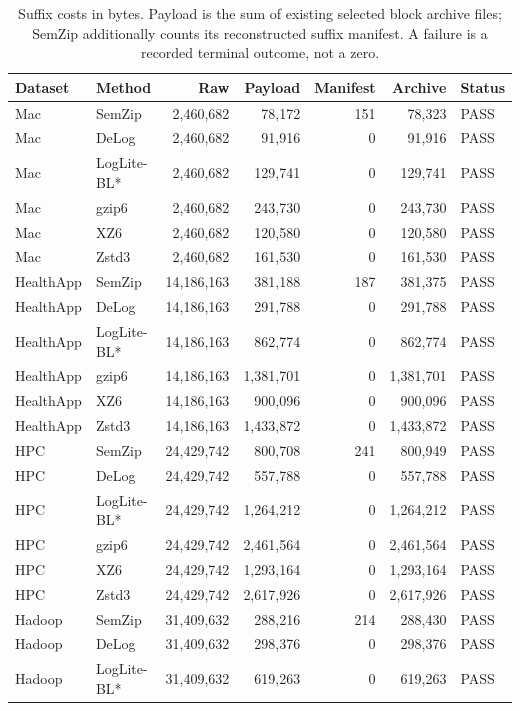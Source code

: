 \begin{longtable}{llrrrrl}
\caption{Suffix costs in bytes. Payload is the sum of existing selected block archive files; SemZip additionally counts its reconstructed suffix manifest. A failure is a recorded terminal outcome, not a zero.}\\
\toprule Dataset & Method & Raw & Payload & Manifest & Archive & Status \\ \midrule\endhead
Mac & SemZip & 2,460,682 & 78,172 & 151 & 78,323 & PASS \\
Mac & DeLog & 2,460,682 & 91,916 & 0 & 91,916 & PASS \\
Mac & LogLite-BL* & 2,460,682 & 129,741 & 0 & 129,741 & PASS \\
Mac & gzip6 & 2,460,682 & 243,730 & 0 & 243,730 & PASS \\
Mac & XZ6 & 2,460,682 & 120,580 & 0 & 120,580 & PASS \\
Mac & Zstd3 & 2,460,682 & 161,530 & 0 & 161,530 & PASS \\
HealthApp & SemZip & 14,186,163 & 381,188 & 187 & 381,375 & PASS \\
HealthApp & DeLog & 14,186,163 & 291,788 & 0 & 291,788 & PASS \\
HealthApp & LogLite-BL* & 14,186,163 & 862,774 & 0 & 862,774 & PASS \\
HealthApp & gzip6 & 14,186,163 & 1,381,701 & 0 & 1,381,701 & PASS \\
HealthApp & XZ6 & 14,186,163 & 900,096 & 0 & 900,096 & PASS \\
HealthApp & Zstd3 & 14,186,163 & 1,433,872 & 0 & 1,433,872 & PASS \\
HPC & SemZip & 24,429,742 & 800,708 & 241 & 800,949 & PASS \\
HPC & DeLog & 24,429,742 & 557,788 & 0 & 557,788 & PASS \\
HPC & LogLite-BL* & 24,429,742 & 1,264,212 & 0 & 1,264,212 & PASS \\
HPC & gzip6 & 24,429,742 & 2,461,564 & 0 & 2,461,564 & PASS \\
HPC & XZ6 & 24,429,742 & 1,293,164 & 0 & 1,293,164 & PASS \\
HPC & Zstd3 & 24,429,742 & 2,617,926 & 0 & 2,617,926 & PASS \\
Hadoop & SemZip & 31,409,632 & 288,216 & 214 & 288,430 & PASS \\
Hadoop & DeLog & 31,409,632 & 298,376 & 0 & 298,376 & PASS \\
Hadoop & LogLite-BL* & 31,409,632 & 619,263 & 0 & 619,263 & PASS \\

\end{longtable}
